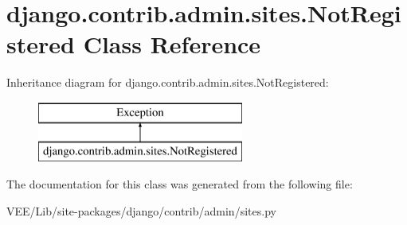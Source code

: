 \hypertarget{classdjango_1_1contrib_1_1admin_1_1sites_1_1_not_registered}{}\section{django.\+contrib.\+admin.\+sites.\+Not\+Registered Class Reference}
\label{classdjango_1_1contrib_1_1admin_1_1sites_1_1_not_registered}
Inheritance diagram for django.\+contrib.\+admin.\+sites.\+Not\+Registered\+:\begin{figure}[H]
\begin{center}
\leavevmode
\includegraphics[height=2.000000cm]{classdjango_1_1contrib_1_1admin_1_1sites_1_1_not_registered}
\end{center}
\end{figure}


The documentation for this class was generated from the following file\+:\begin{DoxyCompactItemize}
\item 
V\+E\+E/\+Lib/site-\/packages/django/contrib/admin/sites.\+py\end{DoxyCompactItemize}
